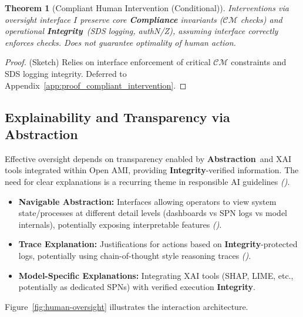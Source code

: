 \documentclass[12pt,a4paper]{report}
\renewcommand{\citep}[1]{\textit{\scriptsize{(\cite{#1})}}}
\newtheorem{theorem}{Theorem}[section]
\newcommand{\Integrity}{\textbf{Integrity}}
\newcommand{\Abstraction}{\textbf{Abstraction}}
\begin{document}
	\begin{theorem}[Compliant Human Intervention (Conditional)]
		\label{thm:compliant_intervention}
		Interventions via oversight interface $I$ preserve core \textbf{Compliance} invariants ($\mathcal{CM}$ checks) and operational \Integrity\ (SDS logging, authN/Z), assuming interface correctly enforces checks. Does not guarantee optimality of human action.
	\end{theorem}
	\begin{proof} (Sketch) Relies on interface enforcement of critical $\mathcal{CM}$ constraints and SDS logging integrity. Deferred to Appendix~\ref{app:proof_compliant_intervention}. \end{proof}
	
	\subsection{Explainability and Transparency via Abstraction} %
	\label{sec:5-7-3} %
	
	Effective oversight depends on transparency enabled by \Abstraction\ and XAI tools integrated within Open AMI, providing \Integrity-verified information. The need for clear explanations is a recurring theme in responsible AI guidelines \citep{Crossing_Principle_Practice_Gap_2024}.
	\begin{itemize}
		\item \textbf{Navigable Abstraction:} Interfaces allowing operators to view system state/processes at different detail levels (dashboards vs SPN logs vs model internals), potentially exposing interpretable features \citep{Anthropic_Decompose_2023}.
		\item \textbf{Trace Explanation:} Justifications for actions based on \Integrity-protected logs, potentially using chain-of-thought style reasoning traces \citep{Bai2022ConstitutionalAI}.
		\item \textbf{Model-Specific Explanations:} Integrating XAI tools (SHAP, LIME, etc., potentially as dedicated SPNs) with verified execution \Integrity.
	\end{itemize}
	Figure~\ref{fig:human-oversight} illustrates the interaction architecture.
	
\end{document}

